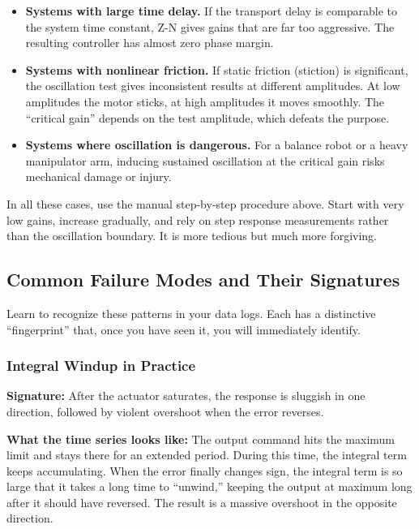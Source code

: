 \begin{itemize}
    \item \textbf{Systems with large time delay.} If the transport delay is comparable to the system time constant, Z-N gives gains that are far too aggressive. The resulting controller has almost zero phase margin.

    \item \textbf{Systems with nonlinear friction.} If static friction (stiction) is significant, the oscillation test gives inconsistent results at different amplitudes. At low amplitudes the motor sticks, at high amplitudes it moves smoothly. The ``critical gain'' depends on the test amplitude, which defeats the purpose.

    \item \textbf{Systems where oscillation is dangerous.} For a balance robot or a heavy manipulator arm, inducing sustained oscillation at the critical gain risks mechanical damage or injury.
\end{itemize}

In all these cases, use the manual step-by-step procedure above. Start with very low gains, increase gradually, and rely on step response measurements rather than the oscillation boundary. It is more tedious but much more forgiving.

\subsection{Common Failure Modes and Their Signatures}

Learn to recognize these patterns in your data logs. Each has a distinctive ``fingerprint'' that, once you have seen it, you will immediately identify.

\subsubsection{Integral Windup in Practice}

\textbf{Signature:} After the actuator saturates, the response is sluggish in one direction, followed by violent overshoot when the error reverses.

\textbf{What the time series looks like:} The output command hits the maximum limit and stays there for an extended period. During this time, the integral term keeps accumulating. When the error finally changes sign, the integral term is so large that it takes a long time to ``unwind,'' keeping the output at maximum long after it should have reversed. The result is a massive overshoot in the opposite direction.

